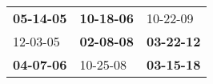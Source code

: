 \begin{supertabular}{p{0.33\columnwidth}p{0.33\columnwidth}p{0.33\columnwidth}}
 \textbf{05-14-05\textsuperscript{}} &  \textbf{10-18-06\textsuperscript{}} &           10-22-09\textsuperscript{} \\
          12-03-05\textsuperscript{} &  \textbf{02-08-08\textsuperscript{}} &  \textbf{03-22-12\textsuperscript{}} \\
 \textbf{04-07-06\textsuperscript{}} &           10-25-08\textsuperscript{} &  \textbf{03-15-18\textsuperscript{}} \\
\end{supertabular}
